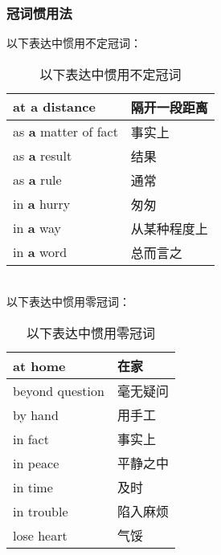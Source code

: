\documentclass[UTF8]{ctexart}
\begin{document}
\newpage

\subsubsection{冠词惯用法}
    以下表达中惯用不定冠词：
    \begin{table}[h!]
        \begin{center}
            \ttfamily
            \begin{tabular}{p{180pt}|p{100pt}}
                \hline
                at \textbf{a} distance&隔开一段距离\\ \hline
                as \textbf{a} matter of fact&事实上\\ \hline
                as \textbf{a} result&结果\\ \hline
                as \textbf{a} rule&通常\\ \hline
                in \textbf{a} hurry&匆匆\\ \hline
                in \textbf{a} way&从某种程度上\\ \hline
                in \textbf{a} word&总而言之\\ \hline
            \end{tabular}
            \rmfamily
            \caption{以下表达中惯用不定冠词}
        \end{center}
    \end{table}\\
    以下表达中惯用零冠词：
    \begin{table}[h!]
        \begin{center}
            \ttfamily
            \begin{tabular}{p{180pt}|p{100pt}}
                \hline
                at home&在家\\ \hline
                beyond question&毫无疑问\\ \hline
                by hand&用手工\\ \hline
                in fact&事实上\\ \hline
                in peace&平静之中\\ \hline
                in time&及时\\ \hline
                in trouble&陷入麻烦\\ \hline
                lose heart&气馁\\ \hline
            \end{tabular}
            \rmfamily
            \caption{以下表达中惯用零冠词}
        \end{center}
    \end{table}\\
\end{document}
